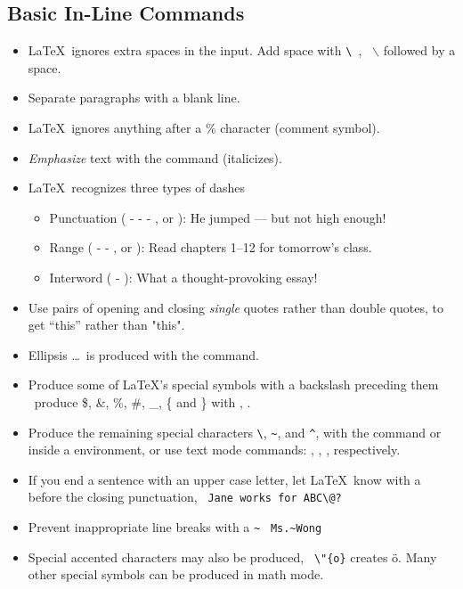 \subsection{Basic In-Line Commands}
\begin{itemize}
\item \LaTeX\ ignores    extra   spaces    in the input.
Add space with \verb*=\ =, \ie\ $\backslash$ followed by a space.
\item Separate paragraphs with a blank line.
\item \LaTeX\ ignores anything after a \% character (comment symbol).
\item \emph{Emphasize} text with the  command (italicizes).
\item \LaTeX\ recognizes three types of dashes
	\begin{itemize}
	\item Punctuation ( - - - , or ): He jumped --- but not high enough!
	\item Range ( - - , or ): Read chapters 1--12 for tomorrow's class.
	\item Interword ( - ): What a thought-provoking essay!
	\end{itemize}
\item Use pairs of opening and closing \emph{single} quotes rather than double quotes, to get ``this'' rather than "this".
\item Ellipsis \ldots\ is produced with the  command.
\item Produce some of \LaTeX 's special symbols with a backslash preceding them \eg\ produce \$, \&, \%, \#, \_, \{ and  \} with \cmmd{\$}, \etc .
\item Produce the remaining special characters \verb=\=, \verb=~=, and \verb=^=, with the  command or inside a  environment, or use text mode commands: , , , respectively.
\item If you end a sentence with an upper case letter, let \LaTeX\ know with a  before the closing punctuation, \eg\ \verb=Jane works for ABC\@?=
\item Prevent inappropriate line breaks with a \verb=~= \eg\ \verb=Ms.~Wong=
\item Special accented characters may also be produced, \eg\ \verb=\"{o}= creates \"{o}.
Many other special symbols can be produced in math mode.
\end{itemize}
